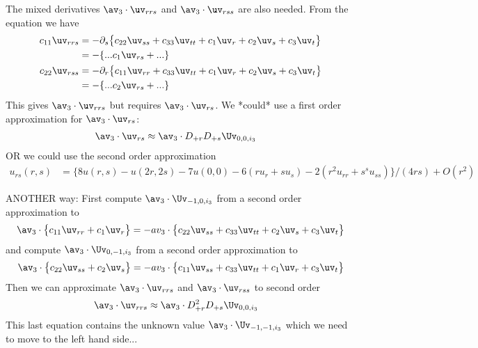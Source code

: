 The mixed derivatives $\av_3\cdot\uv_{rrs}$ and $\av_3\cdot\uv_{rss}$ are also needed.
From the equation we have
\begin{align}
    c_{11} \uv_{rrs} & = - \partial_s\big\{ c_{22} \uv_{ss} + c_{33} \uv_{tt} 
                       + c_{1} \uv_{r} + c_{2} \uv_{s} + c_{3} \uv_{t} \big\} \\
                     &= -\{ ... c_{1} \uv_{rs} + ... \} \\
  c_{22} \uv_{rss} &  = - \partial_r\big\{ c_{11} \uv_{rr} + c_{33} \uv_{tt} 
                       + c_{1} \uv_{r} + c_{2} \uv_{s} + c_{3} \uv_{t} \big\} \\
                     &= -\{ ... c_{2} \uv_{rs} + ... \} \\
\end{align}
This gives $\av_3\cdot\uv_{rrs}$ but requires $\av_3\cdot\uv_{rs}$.
We *could* use a first order approximation for $\av_3\cdot\uv_{rs}$:
\begin{align}
  \av_3\cdot\uv_{rs} &\approx \av_3\cdot D_{+r}D_{+s} \Uv_{0,0,i_3}
\end{align}
OR we could use the second order approximation
\begin{align*}
  u_{rs}(r,s) &= \big\{ 8 u(r,s) - u(2r,2s) - 7 u(0,0) - 6( ru_r+ su_s) -2( r^2 u_{rr} + s^s u_{ss} )
                     \big\} /(4 r s) + O( r^2 )
\end{align*}



ANOTHER way: First compute $\av_3\cdot\Uv_{-1,0,i_3}$ from a second order
approximation to
\begin{align}
  \av_3\cdot\big\{ c_{11} \uv_{rr} + c_1 \uv_r\big\}  &= - av_3\cdot\big\{ c_{22} \uv_{ss} + c_{33} \uv_{tt} 
                        + c_{2} \uv_{s} + c_{3} \uv_{t} \big\} \\
\end{align}
and compute $\av_3\cdot\Uv_{0,-1,i_3}$ from a second order
approximation to
\begin{align}
  \av_3\cdot\big\{ c_{22} \uv_{ss} + c_2 \uv_s\big\}  &= - av_3\cdot\big\{ c_{11} \uv_{ss} + c_{33} \uv_{tt} 
                       + c_{1} \uv_{r}  + c_{3} \uv_{t} \big\} \\
\end{align}
Then we can approximate $\av_3\cdot\uv_{rrs}$ and $\av_3\cdot\uv_{rss}$ to second order
\begin{align}
   \av_3\cdot\uv_{rrs} &\approx \av_3\cdot D_{+r}^2D_{+s} \Uv_{0,0,i_3}
\end{align}
This last equation contains the unknown value $\av_3\cdot\Uv_{-1,-1,i_3}$ which we need to move to
the left hand side...

